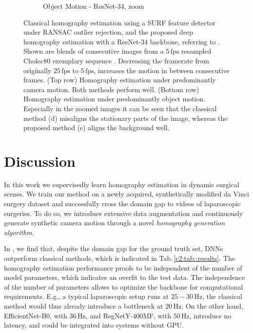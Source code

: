 \begin{landscape}
\begin{figure}
\begin{subfigure}[b]{0.5\textwidth}
    \caption{Object Motion - ResNet-34, zoom}
\end{subfigure}
\caption{Classical homography estimation using a SURF feature detector under RANSAC outlier rejection, and the proposed deep homography estimation with a ResNet-34 backbone, referring to . Shown are blends of consecutive images from a $5\,\text{fps}$ resampled Cholec80 exemplary sequence \cite{twinanda2016endonet}. Decreasing the framerate from originally $25\,\text{fps}$ to $5\,\text{fps}$, increases the motion in between consecutive frames. (Top row) Homography estimation under predominantly camera motion. Both methods perform well. (Bottom row) Homography estimation under predominantly object motion. Especially in the zoomed images it can be seen that the classical method (d) misaligns the stationary parts of the image, whereas the proposed method (e) aligns the background well.}
\label{c2:fig:qualitative}
\end{figure}
\end{landscape}



\section{Discussion}

In this work we supervisedly learn homography estimation in dynamic surgical scenes. We train our method on a newly acquired, synthetically modified da Vinci surgery dataset and successfully cross the domain gap to videos of laparoscopic surgeries. To do so, we introduce extensive data augmentation and continuously generate synthetic camera motion through a novel \textit{homography generation algorithm}.

In , we find that, despite the domain gap for the ground truth set, DNNs outperform classical methods, which is indicated in Tab.\,\ref{c2:tab::results}. The homography estimation performance proofs to be independent of the number of model parameters, which indicates an overfit to the test data. The independence of the number of parameters allows to optimize the backbone for computational requirements. E.g., a typical laparoscopic setup runs at $25-30\,\text{Hz}$, the classical method would thus already introduce a bottleneck at $20\,\text{Hz}$. On the other hand, EfficientNet-B0, with $36\,\text{Hz}$, and RegNetY-400MF, with $50\,\text{Hz}$, introduce no latency, and could be integrated into systems without GPU.

